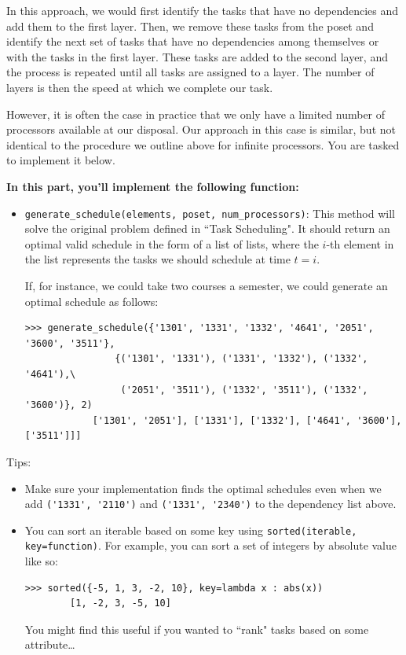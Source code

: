 \documentclass{article}
\begin{document}
    \vspace{2mm}
    In this approach, we would first identify the tasks that have no dependencies and add them to the first layer. Then, we remove these tasks from the poset and identify the next set of tasks that have no dependencies among themselves or with the tasks in the first layer. These tasks are added to the second layer, and the process is repeated until all tasks are assigned to a layer. The number of layers is then the speed at which we complete our task.

    \vspace{2mm}    
    However, it is often the case in practice that we only have a limited number of processors available at our disposal. Our approach in this case is similar, but not identical to the procedure we outline above for infinite processors. You are tasked to implement it below.

    \begin{tcolorbox}[colback=yellow!30]
        \textbf{In this part, you'll implement the following function:}
        \begin{itemize}
            \item \lstinline{generate_schedule(elements, poset, num_processors)}:  This method will solve the original problem defined in ``Task Scheduling". It should return an optimal valid schedule in the form of a list of lists, where the $i$-th element in the list represents the tasks we should schedule at time $t = i$.

        If, for instance, we could take two courses a semester, we could generate an optimal schedule as follows:
    \begin{lstlisting}[belowskip=-10pt]
        >>> generate_schedule({'1301', '1331', '1332', '4641', '2051', '3600', '3511'},
                {('1301', '1331'), ('1331', '1332'), ('1332', '4641'),\
                 ('2051', '3511'), ('1332', '3511'), ('1332', '3600')}, 2)
            ['1301', '2051'], ['1331'], ['1332'], ['4641', '3600'], ['3511']]]
    \end{lstlisting}
        \end{itemize}
        Tips: 
        \begin{itemize}
            \item Make sure your implementation finds the optimal schedules even when we add \lstinline{('1331', '2110')} and \lstinline{('1331', '2340')} to the dependency list above.
            \item You can sort an iterable based on some key using \lstinline{sorted(iterable, key=function)}. For example, you can sort a set of integers by absolute value like so:
    \begin{lstlisting}[belowskip=-0.8 \baselineskip]
        >>> sorted({-5, 1, 3, -2, 10}, key=lambda x : abs(x))
        [1, -2, 3, -5, 10]
    \end{lstlisting}
        You might find this useful if you wanted to ``rank" tasks based on some attribute\ldots

        \end{itemize}
    \end{tcolorbox}
\end{document}
